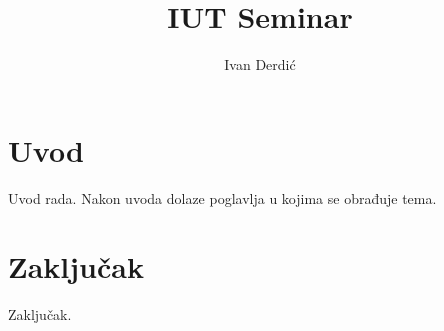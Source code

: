\documentclass[times, utf8, seminar, numeric]{fer}
\begin{document}
\title{IUT Seminar}

\author{Ivan Derdić}

\maketitle

\tableofcontents

\chapter{Uvod}
Uvod rada. Nakon uvoda dolaze poglavlja u kojima se obrađuje tema.






\chapter{Zaključak}
Zaključak.



\end{document}
